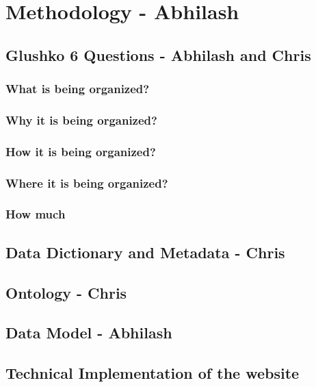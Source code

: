 \section {Methodology - Abhilash}

\subsection{Glushko 6 Questions - Abhilash and Chris}

\subsubsection{What is being organized?}

\subsubsection{Why it is being organized?}

\subsubsection{How it is being organized?}

\subsubsection{Where it is being organized?}

\subsubsection{How much}

\subsection{Data Dictionary and Metadata - Chris}

\subsection{Ontology - Chris} 

\subsection{Data Model - Abhilash} 

\subsection{Technical Implementation of the website}

